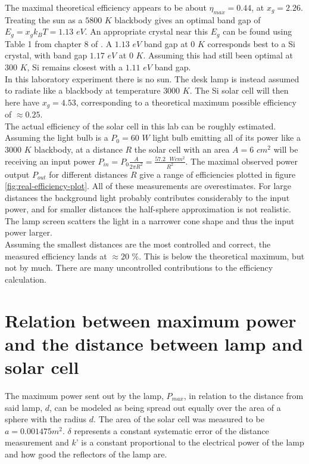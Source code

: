 \documentclass[a4paper,twoside=false,abstract=false,numbers=noenddot,
titlepage=false,headings=small,parskip=half,version=last]{scrartcl}
\begin{document}
The maximal theoretical efficiency appears to be about $\eta_{max}=0.44$, at $x_g=2.26$.
Treating the sun as a $5800$ $K$ blackbody gives an optimal band gap of $E_g = x_g k_B T = 1.13$ $eV$.
An appropriate crystal near this $E_g$ can be found using Table 1 from chapter 8 of \cite{Kittel}.
A $1.13$ $eV$ band gap at $0$ $K$ corresponds best to a Si crystal, with band gap $1.17$ $eV$ at $0$ $K$.
Assuming this had still been optimal at $300$ $K$, Si remains closest with a $1.11$ $eV$ band gap.\\
In this laboratory experiment there is no sun. The desk lamp is instead assumed to radiate like a blackbody at temperature $3000$ $K$. The Si solar cell will then here have $x_g = 4.53$, corresponding to a theoretical maximum possible efficiency of $\approx 0.25$.\\
The actual efficiency of the solar cell in this lab can be roughly estimated.
Assuming the light bulb is a $P_0=60$ $W$ light bulb emitting all of its power like a $3000$ $K$ blackbody, at a distance $R$ the solar cell with an area $A=6$ $cm^2$ will be receiving an input power $P_{in} = P_0 \frac{A}{2\pi R^2} = \frac{57.2\text{ }Wcm^2}{R^2}$.
The maximal observed power output $P_{out}$ for different distances $R$ give a range of efficiencies plotted in figure \ref{fig:real-efficiency-plot}.
All of these measurements are overestimates.
For large distances the background light probably contributes considerably to the input power, and for smaller distances the half-sphere approximation is not realistic.
The lamp screen scatters the light in a narrower cone shape and thus the input power larger.\\
Assuming the smallest distances are the most controlled and correct, the measured efficiency lands at $\approx 20$ $\%$. This is below the theoretical maximum, but not by much. There are many uncontrolled contributions to the efficiency calculation.

\section{Relation between maximum power and the distance between lamp and solar cell}
The maximum power sent out by the lamp, $P_{max}$, in relation to the distance from said lamp, $d$, can be modeled as being spread out equally over the area of a sphere with the radius $d$. The area of the solar cell was measured to be $a=0.001475 m^{2}$. $\delta$ represents a constant systematic error of the distance measurement and $k’$ is a constant proportional to the electrical power of the lamp and how good the reflectors of the lamp are.
\end{document}
